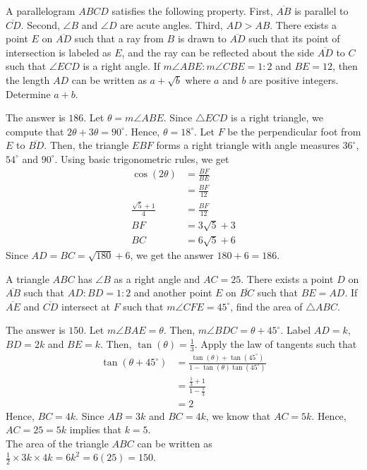 \begin{problem}
A parallelogram $ABCD$ satisfies the following property. First, $\overline{AB}$ is parallel to $\overline{CD}$. Second, $\angle B$ and $\angle D$ are acute angles. Third, $AD>AB$. There exists a point $E$ on $\overline{AD}$ such that a ray from $B$ is drawn to $\overline{AD}$ such that its point of intersection is labeled as $E$, and the ray can be reflected about the side $\overline{AD}$ to $C$ such that $\angle ECD$ is a right angle. If $m\angle ABE : m \angle CBE = 1:2$ and $BE=12$, then the length $AD$ can be written as $a+\sqrt{b}$ where $a$ and $b$ are positive integers. Determine $a+b$.
\end{problem}

\begin{solution}
The answer is $186$. Let $\theta=m\angle ABE$. Since $\triangle ECD$ is a right triangle, we compute that $2\theta+3\theta=90^\circ$. Hence, $\theta=18^\circ$. Let $F$ be the perpendicular foot from $E$ to $\overline{BD}$. Then, the triangle $EBF$ forms a right triangle with angle measures $36^\circ$, $54^\circ$ and $90^\circ$. Using basic trigonometric rules, we get
\begin{align*}
    \cos(2\theta)&=\frac{BF}{BE}\\
    &=\frac{BF}{12}\\
    \frac{\sqrt{5}+1}{4}&=\frac{BF}{12}\\
    BF&=3\sqrt{5}+3\\
    BC&=6\sqrt{5}+6
\end{align*}
Since $AD=BC=\sqrt{180}+6$, we get the answer $180+6=186$.
\end{solution}

\begin{problem}
A triangle $ABC$ has $\angle B$ as a right angle and $AC=25$. There exists a point $D$ on $\overline{AB}$ such that $AD:BD=1:2$ and another point $E$ on $\overline{BC}$ such that $BE=AD$. If $\overline{AE}$ and $\overline{CD}$ intersect at $F$ such that $m\angle CFE = 45^\circ$, find the area of $\triangle ABC$.
\end{problem}

\begin{solution}
The answer is $150$. Let $m\angle BAE=\theta$. Then, $m\angle BDC = \theta + 45^\circ$. Label $AD=k$, $BD=2k$ and $BE=k$. Then, $\tan(\theta)=\frac{1}{3}$. Apply the law of tangents such that
\begin{align*}
\tan(\theta+45^\circ)&=\frac{\tan(\theta)+\tan(45^\circ)}{1-\tan(\theta)\tan(45^\circ)}\\
&=\frac{\frac13+1}{1-\frac13}\\
&=2
\end{align*}
Hence, $BC=4k$. Since $AB=3k$ and $BC=4k$, we know that $AC=5k$. Hence, $AC=25=5k$ implies that $k=5$.\\
\bigskip
The area of the triangle $ABC$ can be written as $\frac12\times3k\times4k=6k^2=6(25)=150$.
\end{solution}

